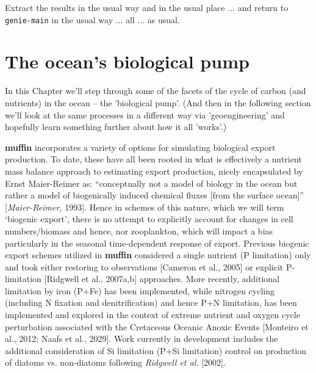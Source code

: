 \documentclass[11pt,fleqn]{book} %
\begin{document}
Extract the results in the usual way and in the usual place ... and return to \texttt{genie-main} in the usual way ... all ... as usual.


\newpage


\section{The ocean's biological pump}

In this Chapter we'll step through some of the facets of the cycle of carbon (and nutrients) in the ocean -- the 'biological pump'. (And then in the following section we'll look at the same processes in a different way via 'geoengineering' and hopefully learn something further about how it all  'works'.)

\textbf{muffin} incorporates a variety of options for simulating biological export production. To date, these have all been rooted in what is effectively a nutrient mass balance approach to estimating export production, nicely encapsulated by Ernst Maier-Reimer as: “conceptually not a model of biology in the ocean but rather a model of biogenically induced chemical fluxes [from the surface ocean]” [\textit{Maier-Reimer,} 1993]. Hence in schemes of this nature, which we will term ‘biogenic export’, there is no attempt to explicitly account for changes in cell numbers/biomass and hence, nor zooplankton, which will impact a bias particularly in the seasonal time-dependent response of export. Previous biogenic export schemes utilized in  \textbf{muffin}  considered a single nutrient (P limitation) only and took either restoring to observations [Cameron et al., 2005] or explicit P-limitation [Ridgwell et al., 2007a,b] approaches. More recently, additional limitation by iron (P+Fe) has been implemented, while nitrogen cycling (including N fixation and denitrification) and hence P+N limitation, has been implemented and explored in the context of extreme nutrient and oxygen cycle perturbation associated with the Cretaceous Oceanic Anoxic Events [Monteiro et al., 2012; Naafs et al., 2029]. Work currently in development includes the additional consideration of Si limitation (P+Si limitation) control on production of diatoms vs. non-diatoms following \textit{Ridgwell et al.} [2002].
\end{document}
